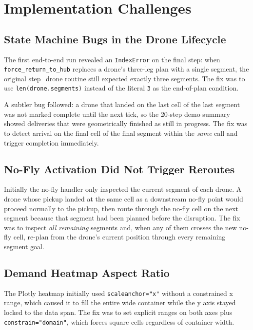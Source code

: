 \documentclass[11pt,a4paper]{article}
\begin{document}
\section{Implementation Challenges}
\label{sec:challenges}

\subsection{State Machine Bugs in the Drone Lifecycle}
The first end-to-end run revealed an \texttt{IndexError} on the final
step: when \texttt{force\_return\_to\_hub} replaces a drone's three-leg
plan with a single segment, the original step\_drone routine still
expected exactly three segments. The fix was to use
\texttt{len(drone.segments)} instead of the literal \texttt{3} as the
end-of-plan condition.

A subtler bug followed: a drone that landed on the last cell of the
last segment was not marked complete until the next tick, so the
20-step demo summary showed deliveries that were geometrically finished
as still in progress. The fix was to detect arrival on the final cell of
the final segment within the \emph{same} call and trigger completion
immediately.

\subsection{No-Fly Activation Did Not Trigger Reroutes}
Initially the no-fly handler only inspected the current segment of each
drone. A drone whose pickup landed at the same cell as a downstream
no-fly point would proceed normally to the pickup, then route through
the no-fly cell on the next segment because that segment had been
planned before the disruption. The fix was to inspect \emph{all
remaining} segments and, when any of them crosses the new no-fly cell,
re-plan from the drone's current position through every remaining
segment goal.

\subsection{Demand Heatmap Aspect Ratio}
The Plotly heatmap initially used \texttt{scaleanchor="x"} without a
constrained x range, which caused it to fill the entire wide container
while the y axis stayed locked to the data span. The fix was to set
explicit ranges on both axes plus \texttt{constrain="domain"}, which
forces square cells regardless of container width.
\end{document}
